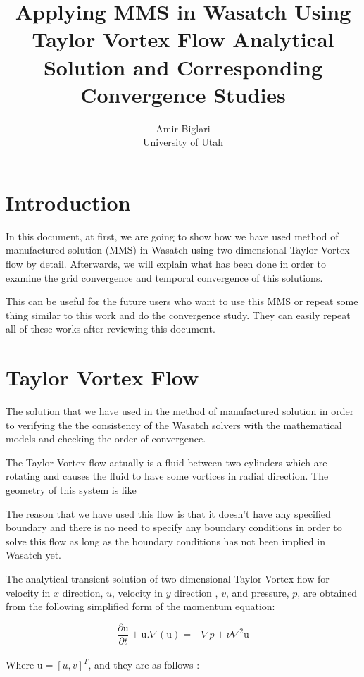 \documentclass[10pt] {article}
\begin{document}
\title{Applying MMS in Wasatch Using Taylor Vortex Flow Analytical Solution and Corresponding Convergence Studies}

\author{Amir Biglari\\
University of Utah}
\maketitle

\section{Introduction}

In this document, at first, we are going to show how we have used method of manufactured solution (MMS) in Wasatch using two dimensional Taylor Vortex flow by detail. Afterwards, we will explain what has been done in order to examine the grid convergence and temporal convergence of this solutions. 

This can be useful for the future users who want to use this MMS or repeat some thing similar to this work and do the convergence study. They can easily repeat all of these works after reviewing this document. 

\section{Taylor Vortex Flow}

The solution that we have used in the method of manufactured solution in order to verifying the the consistency of the Wasatch solvers with the mathematical models and checking the order of convergence. 

The Taylor Vortex flow actually is a fluid between two cylinders which are rotating and causes the fluid to have some vortices in radial direction. The geometry of this system is like

The reason that we have used this flow is that it doesn't have any specified boundary and there is no need to specify any boundary conditions in order to solve this flow as long as the boundary conditions has not been implied in Wasatch yet. 

The analytical transient solution of two dimensional Taylor Vortex flow for velocity in $x$ direction, $u$, velocity in $y$ direction , $v$, and pressure, $p$, are obtained from the following simplified form of the momentum equation:

$$\frac{\partial\textrm{u}}{\partial t}+\textrm{u}.\nabla(\textrm{u})=-\nabla p+\nu\nabla^{2}\textrm{u}$$\\
Where $\textrm{u}=[u,v]^T$, and they are as follows \cite{rjm_diss}:
\end{document}
